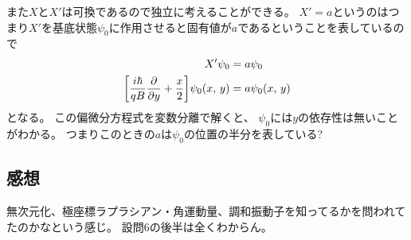 \documentclass[../../master.tex]{subfiles}
\begin{document}
また\(X\)と\(X'\)は可換であるので独立に考えることができる。
\(X'=a\)というのはつまり\(X'\)を基底状態\(\psi_0\)に作用させると固有値が\(a\)であるということを表しているので
\begin{equation}\begin{aligned}[b]
    X'\psi_0 &= a \psi_0\\
    \qty[\frac{i\hbar}{qB}\pdv{y}+\frac{x}{2}]\psi_0(x,\,y) &= a\psi_0(x,\,y)
\end{aligned}\end{equation}
となる。
この偏微分方程式を変数分離で解くと、
\(\psi_0\)には\(y\)の依存性は無いことがわかる。
つまりこのときの\(a\)は\(\psi_0\)の位置の半分を表している?

\subsection*{感想}
無次元化、極座標ラプラシアン・角運動量、調和振動子を知ってるかを問われてたのかなという感じ。
設問6の後半は全くわからん。
\end{document}
